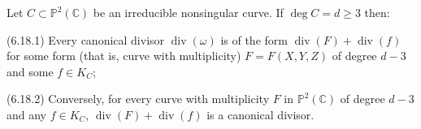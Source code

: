 Let $C \subset \mathbb{P}^2(\mathbb{C})$ be an irreducible nonsingular curve. If $\deg C = d \geqslant 3$ then:

(6.18.1) Every canonical divisor $\operatorname{div}(\omega)$ is of the form $\operatorname{div}(F) + \operatorname{div}(f)$ for some form (that is, curve with multiplicity) $F = F(X, Y, Z)$ of degree $d - 3$ and some $f \in K_C$;

(6.18.2) Conversely, for every curve with multiplicity $F$ in $\mathbb{P}^2(\mathbb{C})$ of degree $d - 3$ and any $f \in K_C$, $\operatorname{div}(F) + \operatorname{div}(f)$ is a canonical divisor.

